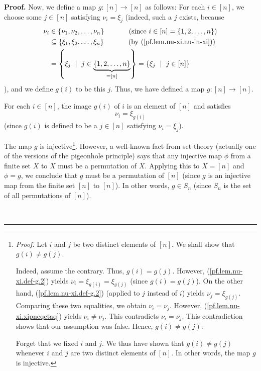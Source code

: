 \documentclass
[numbers=enddot,12pt,final,onecolumn,notitlepage,english]{scrartcl}%
\theoremstyle{definition}
\newenvironment{proof}[1][Proof]{\noindent\textbf{#1.} }{\ \rule{0.5em}{0.5em}}
\newenvironment{verlong}{}{}
\begin{document}
\begin{verlong}
\begin{proof}
Now, we define a map $g:\left[  n\right]  \rightarrow\left[  n\right]  $ as
follows: For each $i\in\left[  n\right]  $, we choose some $j\in\left[
n\right]  $ satisfying $\nu_{i}=\xi_{j}$ (indeed, such a $j$ exists, because
\begin{align*}
\nu_{i}  &  \in\left\{  \nu_{1},\nu_{2},\ldots,\nu_{n}\right\}
\ \ \ \ \ \ \ \ \ \ \left(  \text{since }i\in\left[  n\right]  =\left\{
1,2,\ldots,n\right\}  \right) \\
&  \subseteq\left\{  \xi_{1},\xi_{2},\ldots,\xi_{n}\right\}
\ \ \ \ \ \ \ \ \ \ \left(  \text{by (\ref{pf.lem.nu-xi.nu-in-xi})}\right) \\
&  =\left\{  \xi_{j}\ \mid\ j\in\underbrace{\left\{  1,2,\ldots,n\right\}
}_{=\left[  n\right]  }\right\}  =\left\{  \xi_{j}\ \mid\ j\in\left[
n\right]  \right\}
\end{align*}
), and we define $g\left(  i\right)  $ to be this $j$. Thus, we have defined a
map $g:\left[  n\right]  \rightarrow\left[  n\right]  $.

For each $i\in\left[  n\right]  $, the image $g\left(  i\right)  $ of $i$ is
an element of $\left[  n\right]  $ and satisfies%
\begin{equation}
\nu_{i}=\xi_{g\left(  i\right)  } \label{pf.lem.nu-xi.def-g.2}%
\end{equation}
(since $g\left(  i\right)  $ is defined to be a $j\in\left[  n\right]  $
satisfying $\nu_{i}=\xi_{j}$).

The map $g$ is injective\footnote{\textit{Proof.} Let $i$ and $j$ be two
distinct elements of $\left[  n\right]  $. We shall show that $g\left(
i\right)  \neq g\left(  j\right)  $.
\par
Indeed, assume the contrary. Thus, $g\left(  i\right)  =g\left(  j\right)  $.
However, (\ref{pf.lem.nu-xi.def-g.2}) yields $\nu_{i}=\xi_{g\left(  i\right)
}=\xi_{g\left(  j\right)  }$ (since $g\left(  i\right)  =g\left(  j\right)
$). On the other hand, (\ref{pf.lem.nu-xi.def-g.2}) (applied to $j$ instead of
$i$) yields $\nu_{j}=\xi_{g\left(  j\right)  }$. Comparing these two
equalities, we obtain $\nu_{i}=\nu_{j}$. However,
(\ref{pf.lem.nu-xi.xipneqetaq}) yields $\nu_{i}\neq\nu_{j}$. This contradicts
$\nu_{i}=\nu_{j}$. This contradiction shows that our assumption was false.
Hence, $g\left(  i\right)  \neq g\left(  j\right)  $.
\par
Forget that we fixed $i$ and $j$. We thus have shown that $g\left(  i\right)
\neq g\left(  j\right)  $ whenever $i$ and $j$ are two distinct elements of
$\left[  n\right]  $. In other words, the map $g$ is injective.}. However, a
well-known fact from set theory (actually one of the versions of the
pigeonhole principle) says that any injective map $\phi$ from a finite set $X$
to $X$ must be a permutation of $X$. Applying this to $X=\left[  n\right]  $
and $\phi=g$, we conclude that $g$ must be a permutation of $\left[  n\right]
$ (since $g$ is an injective map from the finite set $\left[  n\right]  $ to
$\left[  n\right]  $). In other words, $g\in S_{n}$ (since $S_{n}$ is the set
of all permutations of $\left[  n\right]  $).


\end{proof}
\end{verlong}
\end{document}

